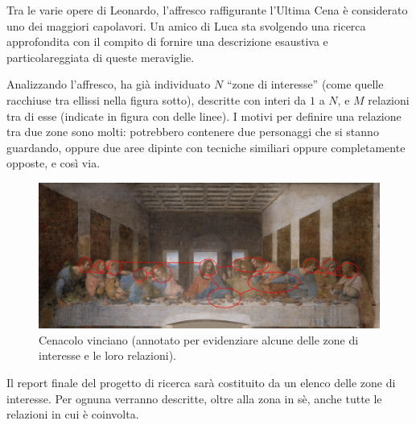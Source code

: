 \usepackage{xcolor}
\usepackage{afterpage}
\usepackage{pifont,mdframed}
\usepackage[bottom]{footmisc}

\makeatletter
\gdef\this@inputfilename{input}
\gdef\this@outputfilename{output}
\makeatother

\newcommand{\funcitem}[2]{\item[$\blacksquare$] \textbf{\large \textsf{Funzione} \texttt{#1}} \vspace{-0.3cm} \begin{center}\begin{tabularx}{\textwidth}{|c|X|} \hline #2 \hline \end{tabularx}\end{center}}

Tra le varie opere di Leonardo, l'affresco raffigurante l'Ultima Cena è considerato uno dei maggiori capolavori. Un amico di Luca sta svolgendo una ricerca approfondita con il compito di fornire una descrizione esaustiva e particolareggiata di queste meraviglie.

Analizzando l'affresco, ha già individuato $N$ ``zone di interesse'' (come quelle racchiuse tra ellissi nella figura sotto), descritte con interi da $1$ a $N$, e $M$ relazioni tra di esse (indicate in figura con delle linee). I motivi per definire una relazione tra due zone sono molti: potrebbero contenere due personaggi che si stanno guardando, oppure due aree dipinte con tecniche similiari oppure completamente opposte, e così via.

\begin{figure}[h]
  \begin{center}
        \includegraphics[width=\linewidth]{ultimacena.jpg}
        \caption{Cenacolo vinciano (annotato per evidenziare alcune delle zone di interesse e le loro relazioni).}
  \end{center}
\end{figure}

Il report finale del progetto di ricerca sarà costituito da un elenco delle zone di interesse. Per ognuna verranno descritte, oltre alla zona in sè, anche tutte le relazioni in cui è coinvolta.

